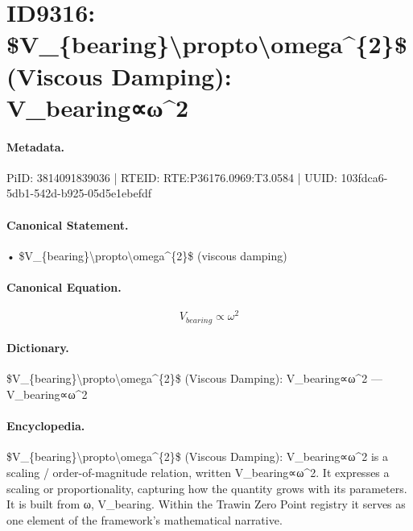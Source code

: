 \section*{ID9316: \$V\_\{bearing\}\textbackslash{}propto\textbackslash{}omega\textasciicircum{}\{2\}\$ (Viscous Damping): V\_bearing∝ω\textasciicircum{}2}
\paragraph{Metadata.}
PiID: 3814091839036 | RTEID: RTE:P36176.0969:T3.0584 | UUID: 103fdca6-5db1-542d-b925-05d5e1ebefdf

\paragraph{Canonical Statement.}
• \$V\_\{bearing\}\textbackslash{}propto\textbackslash{}omega\textasciicircum{}\{2\}\$ (viscous damping)

\paragraph{Canonical Equation.}
\[
V_{bearing}\propto\omega^{2}
\]

\paragraph{Dictionary.}
\$V\_\{bearing\}\textbackslash{}propto\textbackslash{}omega\textasciicircum{}\{2\}\$ (Viscous Damping): V\_bearing∝ω\textasciicircum{}2 — V\_bearing∝ω\textasciicircum{}2

\paragraph{Encyclopedia.}
\$V\_\{bearing\}\textbackslash{}propto\textbackslash{}omega\textasciicircum{}\{2\}\$ (Viscous Damping): V\_bearing∝ω\textasciicircum{}2 is a scaling / order-of-magnitude relation, written V\_bearing∝ω\textasciicircum{}2. It expresses a scaling or proportionality, capturing how the quantity grows with its parameters. It is built from ω, V\_bearing. Within the Trawin Zero Point registry it serves as one element of the framework's mathematical narrative.
